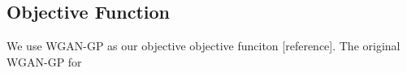 \subsection{Objective Function}
We use WGAN-GP as our objective objective funciton [reference]. The original WGAN-GP for